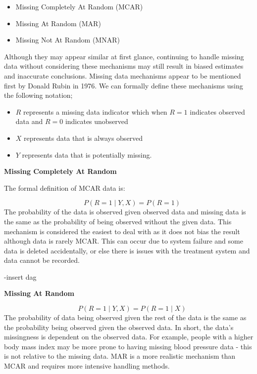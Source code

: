 \documentclass{article}
\providecommand{\tightlist}{%
  \setlength{\itemsep}{0pt}\setlength{\parskip}{0pt}}
\begin{document}
\begin{itemize}
\tightlist
\item
  Missing Completely At Random (MCAR)
\item
  Missing At Random (MAR)
\item
  Missing Not At Random (MNAR)
\end{itemize}

Although they may appear similar at first glance, continuing to handle
missing data without considering these mechanisms may still result in
biased estimates and inaccurate conclusions. Missing data mechanisms
appear to be mentioned first by Donald Rubin in 1976. We can formally
define these mechanisms using the following notation;

\begin{itemize}
\tightlist
\item
  \(R\) represents a missing data indicator which when \(R=1\) indicates
  observed data and \(R=0\) indicates unobserved
\item
  \(X\) represents data that is always observed
\item
  \(Y\) represents data that is potentially missing.
\end{itemize}

\textbf{Missing Completely At Random}

The formal definition of MCAR data is:

\[\quad P(R = 1 \mid Y, X) = P(R = 1)\] The probability of the data is
observed given observed data and missing data is the same as the
probability of being observed without the given data. This mechanism is
considered the easiest to deal with as it does not bias the result
although data is rarely MCAR. This can occur due to system failure and
some data is deleted accidentally, or else there is issues with the
treatment system and data cannot be recorded.

-insert dag

\textbf{Missing At Random}

\[\quad P(R = 1 \mid Y, X) = P(R = 1 \mid X)\] The probability of data
being observed given the rest of the data is the same as the probability
being observed given the observed data. In short, the data's missingness
is dependent on the observed data. For example, people with a higher
body mass index may be more prone to having missing blood pressure data
- this is not relative to the missing data. MAR is a more realistic
mechanism than MCAR and requires more intensive handling methods.
\end{document}
